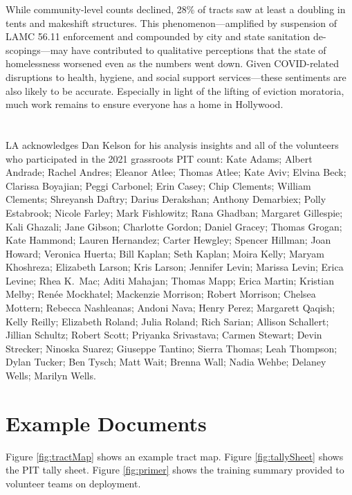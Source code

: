 \documentclass[11pt,twocolumn]{article}
\def\Count{count}
\begin{document}
While community-level counts declined, 28\% of tracts saw at least a doubling in tents and 
makeshift structures. This phenomenon---amplified by suspension of LAMC 56.11 enforcement
and compounded by city and state sanitation de-scopings---may have contributed to qualitative 
perceptions that the state of homelessness worsened even as the numbers went down. Given 
COVID-related disruptions to health, hygiene, and social support services---these sentiments are also 
likely to be accurate. Especially in light of the lifting of eviction moratoria, much work remains to 
ensure everyone has a home in Hollywood.

\section*{}

LA acknowledges Dan Kelson for his analysis insights and all of the volunteers who participated
in the 2021 grassroots PIT \Count: Kate Adams;
Albert Andrade;
Rachel Andres;
Eleanor Atlee;
Thomas Atlee; 
Kate Aviv;
Elvina Beck; 
Clarissa Boyajian;
Peggi Carbonel;
Erin Casey;
Chip Clements;
William Clements;
Shreyansh Daftry;
Darius Derakshan;
Anthony Demarbiex;
Polly Estabrook;
Nicole Farley;
Mark Fishlowitz; 
Rana Ghadban;
Margaret Gillespie; 
Kali Ghazali;
Jane Gibson;
Charlotte Gordon;
Daniel Gracey;
Thomas Grogan;
Kate Hammond;
Lauren Hernandez;
Carter Hewgley;
Spencer Hillman;
Joan Howard;
Veronica Huerta;
Bill Kaplan;
Seth Kaplan;
Moira Kelly; 
Maryam Khoshreza;
Elizabeth Larson;
Kris Larson;
Jennifer Levin;
Marissa Levin;
Erica Levine;
Rhea K.~Mac;
Aditi Mahajan;
Thomas Mapp;
Erica Martin;
Kristian Melby;
Ren\'{e}e Mockhatel;
Mackenzie Morrison;
Robert Morrison;
Chelsea Mottern;
Rebecca Nashleanas;
Andoni Nava;
Henry Perez;
Margarett Qaqish;
Kelly Reilly;
Elizabeth Roland;
Julia Roland;
Rich Sarian;
Allison Schallert; 
Jillian Schultz;
Robert Scott;
Priyanka Srivastava;
Carmen Stewart;
Devin Strecker; 
Ninoska Suarez;
Giuseppe Tantino;
Sierra Thomas; 
Leah Thompson; 
Dylan Tucker;
Ben Tysch; 
Matt Wait;
Brenna Wall;
Nadia Wehbe;
Delaney Wells;
Marilyn Wells.

\appendix

\section{Example Documents}

Figure \ref{fig:tractMap} shows an example tract map. 
Figure \ref{fig:tallySheet} shows the PIT tally sheet.
Figure \ref{fig:primer} shows the training summary provided to volunteer
teams on deployment.
\end{document}
